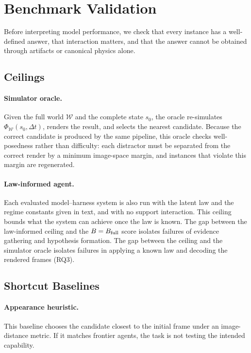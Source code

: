 \section{Benchmark Validation}
\label{sec:validation}

Before interpreting model performance, we check that every instance has a well-defined answer, that interaction matters, and that the answer cannot be obtained through artifacts or canonical physics alone.

\subsection{Ceilings}

\paragraph{Simulator oracle.} Given the full world $\mathcal{W}$ and the complete state $s_0$, the oracle re-simulates $\Phi_{\mathcal{W}}(s_0,\Delta t)$, renders the result, and selects the nearest candidate. Because the correct candidate is produced by the same pipeline, this oracle checks well-posedness rather than difficulty: each distractor must be separated from the correct render by a minimum image-space margin, and instances that violate this margin are regenerated. 

\paragraph{Law-informed agent.} Each evaluated model--harness system is also run with the latent law and the regime constants given in text, and with no support interaction. This ceiling bounds what the system can achieve once the law is known. The gap between the law-informed ceiling and the $B=B_{\rm full}$ score isolates failures of evidence gathering and hypothesis formation. The gap between the ceiling and the simulator oracle isolates failures in applying a known law and decoding the rendered frames (RQ3). 

\subsection{Shortcut Baselines}

\paragraph{Appearance heuristic.} This baseline chooses the candidate closest to the initial frame under an image-distance metric. If it matches frontier agents, the task is not testing the intended capability.

